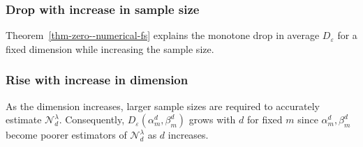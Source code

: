 
\subsubsection{Drop with increase in sample size} Theorem~\ref{thm-zero--numerical-fs} explains the monotone drop in average $D_\varepsilon$ for a fixed dimension while increasing the sample size.

\subsubsection{Rise with increase in dimension} As the dimension increases, larger sample sizes are required to accurately estimate $\mathcal N_d^\lambda$. Consequently, $D_\varepsilon(\alpha_m^d, \beta_m^d)$ grows with $d$ for fixed $m$ since $\alpha_m^d, \beta_m^d$ become poorer estimators of $\mathcal N_d^\lambda$ as $d$ increases. 

